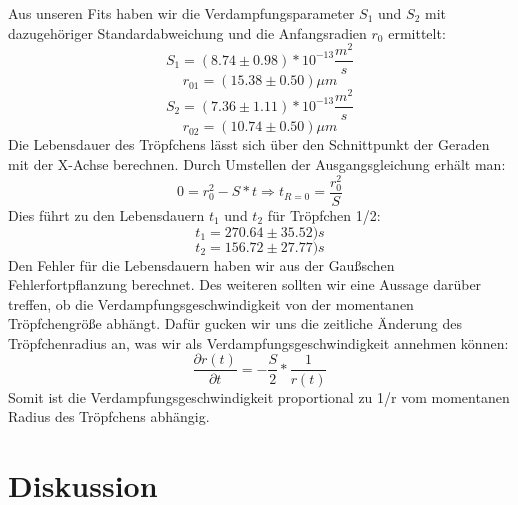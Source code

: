 \documentclass[10pt,a4paper]{article}
\begin{document}
Aus unseren Fits haben wir die Verdampfungsparameter $S_{1}$ und $S_{2}$ mit dazugehöriger Standardabweichung und die Anfangsradien $r_{0}$ ermittelt:
$$ S_{1} = (8.74 \pm 0.98) *10^{-13} \frac{m^{2}}{s} $$ 
$$r_{01} = (15.38 \pm 0.50) \mu m$$
$$  S_{2} = (7.36 \pm 1.11) *10^{-13} \frac{m^{2}}{s}$$
$$ r_{02} = (10.74 \pm 0.50) \mu m $$
Die Lebensdauer des Tröpfchens lässt sich über den Schnittpunkt der Geraden mit der X-Achse berechnen. Durch Umstellen der Ausgangsgleichung erhält man:
$$ 0 = r_{0}^{2} - S*t \Rightarrow t_{R=0} =  \frac{r_{0}^{2}}{S} $$
Dies führt zu den Lebensdauern $t_{1}$ und $t_{2}$ für Tröpfchen 1/2:
$$ t_{1} = 270.64 \pm 35.52)s $$
$$ t_{2} = 156.72 \pm 27.77)s $$
Den Fehler für die Lebensdauern haben wir aus der Gaußschen Fehlerfortpflanzung berechnet. Des weiteren sollten wir eine Aussage darüber treffen, ob die Verdampfungsgeschwindigkeit von der momentanen Tröpfchengröße abhängt. Dafür gucken wir uns die zeitliche Änderung des Tröpfchenradius an, was wir als Verdampfungsgeschwindigkeit annehmen können:
$$\frac{\partial r(t)}{\partial t} = -\frac{S}{2} * \frac{1}{r(t)}$$
Somit ist die Verdampfungsgeschwindigkeit proportional zu 1/r vom momentanen Radius des Tröpfchens abhängig.

\section{Diskussion}
\end{document}
